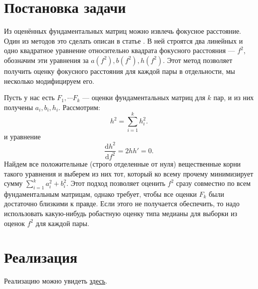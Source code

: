 \label{focal}
\section{Постановка задачи}
Из оценённых фундаментальных матриц можно извлечь фокусное расстояние. Один из методов это сделать описан в статье \cite{Sturm:2005:FLC:1090456.1649082}. В ней строятся два линейных и одно квадратное уравнение относительно квадрата фокусного расстояния --- $f^2$, обозначим эти уравнения за $a\left(f^2\right), b\left(f^2\right), h\left(f^2\right)$. Этот метод позволяет получить  оценку фокусного расстояния для каждой пары в отдельности, мы несколько модифицируем его. 

Пусть у нас есть $F_1, \cdots F_k$ --- оценки фундаментальных матриц для $k$ пар, и из них получены $a_i, b_i, h_i$. 
Рассмотрим:
\begin{equation}
	h^2 = \sum\limits_{i=1}^{k} h^2_i.
\end{equation} 
и уравнение
\begin{equation}
	\frac{\mathrm{d} h^2}{\mathrm{d}f^2} = 2hh' = 0.
\end{equation} 
Найдем все положительные (строго отделенные от нуля) вещественные корни такого уравнения и выберем из них тот, который ко всему прочему минимизирует сумму $\sum\limits_{i=1}^{k} a_i^2 + b_i^2$. Этот подход позволяет оценить $f^2$ сразу совместно по всем фундаментальным матрицам, однако требует, чтобы все оценки $F_k$ были достаточно близкими к правде. Если этого не получается обеспечить, то надо использовать какую-нибудь робастную оценку типа медианы для выборки из оценок $f^2$ для каждой пары.
\section{Реализация}
Реализацию можно увидеть \href{https://github.com/QuantumMechanicus/camera_calibration_test/blob/dev/subroutines/focal_length_estimator/Focal_Estimator.cpp}{здесь}.
